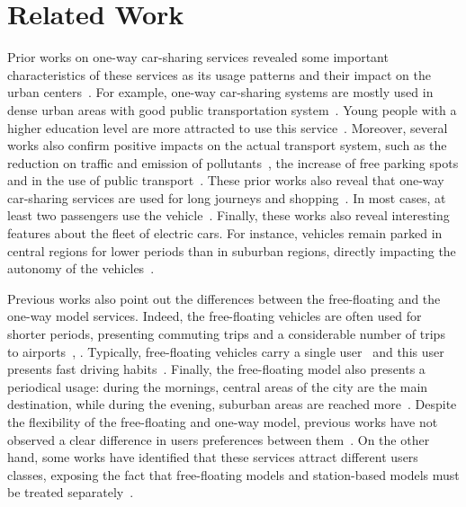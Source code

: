 \section{Related Work} 
\label{sec:4_5_related}

Prior works on one-way car-sharing services revealed some important characteristics of these services as its usage patterns and their impact on the urban centers~\cite{becker:17, ciari2014modeling, martin2011impact, boldrini:16}. For example, one-way car-sharing systems are mostly used in dense urban areas with good public transportation system~\cite{stillwater2009carsharing}. Young people with a higher education level are more attracted to use this service~\cite{burkhardt2006attracted}.  Moreover, several works also confirm positive impacts on the actual transport system, such as the reduction on traffic and emission of pollutants~\cite{cervero2004city,martin2011impact}, the increase of free parking spots and in the use of public transport~\cite{shaheen2010carsharing}.
These prior works also reveal that one-way car-sharing services are used for long journeys and shopping~\cite{ciari2014modeling}. In most cases, at least two passengers use the vehicle~\cite{becker:17}. Finally, these works also reveal interesting features about the fleet of electric cars. For instance, vehicles remain parked in central regions for lower periods than in suburban regions, directly impacting the autonomy of the vehicles~\cite{boldrini:16}.

Previous works also point out the differences between the free-floating and the one-way model services. Indeed, the free-floating vehicles are often used for shorter periods, presenting commuting trips and a considerable number of trips to airports~\cite{ciari2014modeling}, \cite{becker:17} \cite{coccacar}. Typically, free-floating vehicles carry a single user~\cite{becker:17} and this user presents fast driving habits~\cite{ciociolaumap}. Finally, the free-floating model also presents a periodical usage: during the mornings, central areas of the city are the main destination, while during the evening, suburban areas are reached more~\cite{ciociolaumap}. 
Despite the flexibility of the free-floating and one-way model, previous works have not observed a clear difference in users preferences between them~\cite{ciari2014modeling}. On the other hand, some works have identified that these services attract different users classes, exposing the fact that free-floating models and station-based models must be treated separately~\cite{becker:17}.

